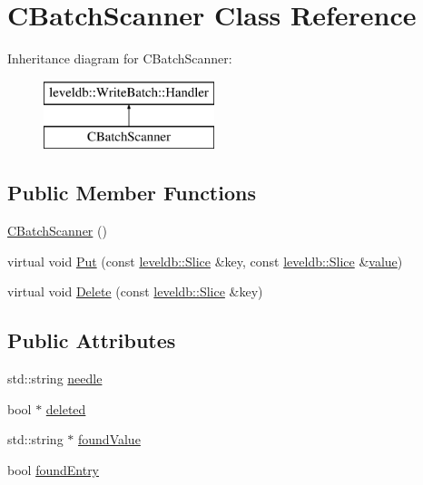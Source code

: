 \hypertarget{class_c_batch_scanner}{}\section{C\+Batch\+Scanner Class Reference}
\label{class_c_batch_scanner}
Inheritance diagram for C\+Batch\+Scanner\+:\begin{figure}[H]
\begin{center}
\leavevmode
\includegraphics[height=2.000000cm]{class_c_batch_scanner}
\end{center}
\end{figure}
\subsection*{Public Member Functions}
\begin{DoxyCompactItemize}
\item 
\hyperlink{class_c_batch_scanner_adca0bf13e3c7eb3f70cf324da1901a4a}{C\+Batch\+Scanner} ()
\item 
virtual void \hyperlink{class_c_batch_scanner_ae993b8af4417559238d9d985975f9f09}{Put} (const \hyperlink{classleveldb_1_1_slice}{leveldb\+::\+Slice} \&key, const \hyperlink{classleveldb_1_1_slice}{leveldb\+::\+Slice} \&\hyperlink{cache_8cc_a0f61d63b009d0880a89c843bd50d8d76}{value})
\item 
virtual void \hyperlink{class_c_batch_scanner_a5569f5c1c04cbdaa1e226895d9cdb51a}{Delete} (const \hyperlink{classleveldb_1_1_slice}{leveldb\+::\+Slice} \&key)
\end{DoxyCompactItemize}
\subsection*{Public Attributes}
\begin{DoxyCompactItemize}
\item 
std\+::string \hyperlink{class_c_batch_scanner_ae04f7151c91676f9f6209737cdc3d086}{needle}
\item 
bool $\ast$ \hyperlink{class_c_batch_scanner_afdb6e59a53fed441090c43750c3c2617}{deleted}
\item 
std\+::string $\ast$ \hyperlink{class_c_batch_scanner_a3a82f2f7068f469eb535435a0b9ae640}{found\+Value}
\item 
bool \hyperlink{class_c_batch_scanner_ad2669c1d3fbd8c206b1f42348dde8cf0}{found\+Entry}
\end{DoxyCompactItemize}


